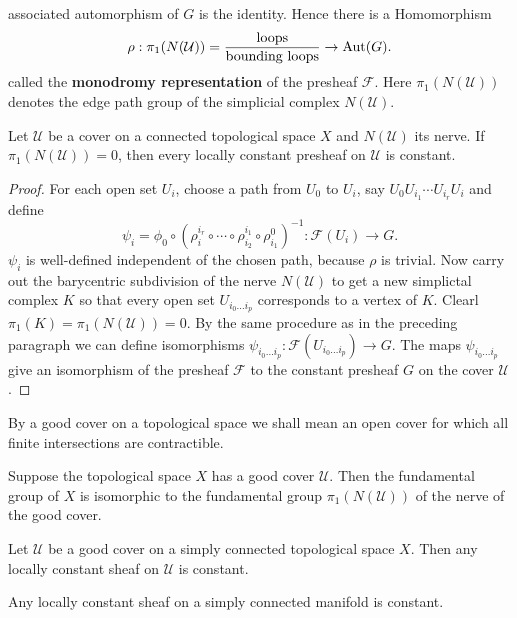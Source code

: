 associated automorphism of $G$ is the identity. Hence there is a Homomorphism
\[\rho:\pi_1(N(\mathcal{U}))=\frac{\text{loops}}{\text{bounding loops}}\to\mathrm{Aut}(G).\]
called the \textbf{monodromy representation} of the presheaf $\mathscr{F}$. Here $\pi_1(N(\mathcal{U}))$ denotes the edge path group of the simplicial complex $N(\mathcal{U})$.
\begin{theorem}
Let $\mathcal{U}$ be a cover on a connected topological space $X$ and $N(\mathcal{U})$ its nerve. If $\pi_1(N(\mathcal{U}))=0$, then every locally constant presheaf on 
$\mathcal{U}$ is constant.
\end{theorem}
\begin{proof}
For each open set $U_i$, choose a path from $U_0$ to $U_i$, say $U_0U_{i_1}\cdots U_{i_r}U_i$ and define 
\[\psi_i=\phi_0\circ(\rho^{i_r}_i\circ\cdots\circ\rho^{i_1}_{i_2}\circ\rho^0_{i_1})^{-1}:\mathscr{F}(U_i)\to G.\]
$\psi_i$ is well-defined independent of the chosen path, because $\rho$ is trivial. Now carry out the barycentric subdivision of the nerve $N(\mathcal{U})$ to get a 
new simplictal complex $K$ so that every open set $U_{i_0\dots i_p}$ corresponds to a vertex of $K$. Clearl $\pi_1(K)=\pi_1(N(\mathcal{U}))=0$. By the same procedure as 
in the preceding paragraph we can define isomorphisms $\psi_{i_0\dots i_p}:\mathscr{F}(U_{i_0\dots i_p})\to G$. The maps $\psi_{i_0\dots i_p}$ give an isomorphism of 
the presheaf $\mathscr{F}$ to the constant presheaf $G$ on the cover $\mathcal{U}$.
\end{proof}
By a good cover on a topological space we shall mean an open cover for which all finite intersections are contractible.
\begin{theorem}
Suppose the topological space $X$ has a good cover $\mathcal{U}$. Then the fundamental group of $X$ is isomorphic to the fundamental group $\pi_1(N(\mathcal{U}))$ of the 
nerve of the good cover.
\end{theorem}
\begin{corollary}
Let $\mathcal{U}$ be a good cover on a simply connected topological space $X$. Then any locally constant sheaf on $\mathcal{U}$ is constant.
\end{corollary}
\begin{corollary}
Any locally constant sheaf on a simply connected manifold is constant.
\end{corollary}
